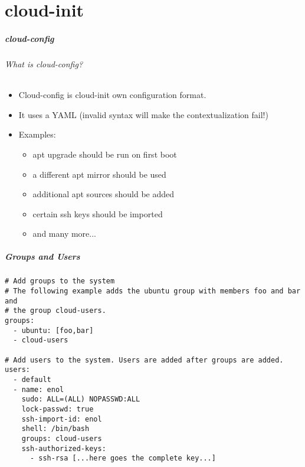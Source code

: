 \part{cloud-init}


\begin{frame}
  \frametitle{cloud-config}
  \framesubtitle{What is cloud-config?}
    \begin{itemize}
        \item Cloud-config is cloud-init own configuration format. 
        \item It uses a YAML (invalid syntax will make the 
        contextualization fail!)
        \item Examples:
        \begin{itemize}
            \item apt upgrade should be run on first boot
            \item a different apt mirror should be used
            \item additional apt sources should be added
            \item certain ssh keys should be imported
            \item and many more...
        \end{itemize}

    \end{itemize}
\end{frame}


\begin{frame}[fragile]
  \frametitle{Groups and Users}

  \begin{Sbox}
  \Fontsmaller
  \begin{minipage}{\linewidth-2\fboxsep-2\fboxrule-4pt}
  \color{white}
  \begin{verbatim}
# Add groups to the system
# The following example adds the ubuntu group with members foo and bar and
# the group cloud-users.
groups:
  - ubuntu: [foo,bar]
  - cloud-users

# Add users to the system. Users are added after groups are added.
users:
  - default
  - name: enol
    sudo: ALL=(ALL) NOPASSWD:ALL
    lock-passwd: true
    ssh-import-id: enol
    shell: /bin/bash
    groups: cloud-users
    ssh-authorized-keys: 
      - ssh-rsa [...here goes the complete key...]
  \end{verbatim}
  \end{minipage}
  \end{Sbox}


\end{frame}

